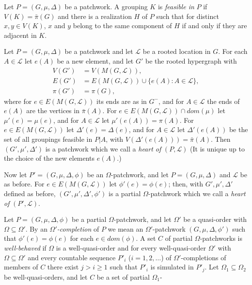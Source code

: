 Let $P = (G, \mu, \Delta)$ be a patchwork. A grouping $K$ is \textit{feasible in} $P$ if $V(K) = \bar{\pi}(G)$ and there is a realization $H$ of $P$ such that for distinct $x, y \in V(K)$, $x$ and $y$ belong to the same component of $H$ if and only if they are adjacent in $K$.

Let $P = (G, \mu, \Delta)$ be a patchwork and let $\mathcal{L}$ be a rooted location in $G$. For each $A \in \mathcal{L}$ let $e(A)$ be a new element, and let $G'$ be the rooted hypergraph with
\begin{align*}
V(G') &= V(M(G, \mathcal{L})), \\
E(G') &= E(M(G, \mathcal{L})) \cup \{e(A) : A \in \mathcal{L}\}, \\
\pi(G') &= \pi(G),
\end{align*}
where for $e \in E(M(G, \mathcal{L}))$ its ends are as in $G^-$, and for $A \in \mathcal{L}$ the ends of $e(A)$ are the vertices in $\bar{\pi}(A)$. For $e \in E(M(G, \mathcal{L})) \cap dom(\mu)$ let $\mu'(e) = \mu(e)$, and for $A \in \mathcal{L}$ let $\mu'(e(A)) = \pi(A)$. For $e \in E(M(G, \mathcal{L}))$ let $\Delta'(e) = \Delta(e)$, and for $A \in \mathcal{L}$ let $\Delta'(e(A))$ be the set of all groupings feasible in $P|A$, with $V(\Delta'(e(A))) = \bar{\pi}(A)$. Then $(G', \mu', \Delta')$ is a patchwork which we call a \textit{heart of} $(P, \mathcal{L})$ (It is unique up to the choice of the new elements $e(A)$.)

Now let $P' = (G, \mu, \Delta, \phi)$ be an $\Omega$-patchwork, and let $P = (G, \mu, \Delta)$ and $\mathcal{L}$ be as before. For $e \in E(M(G, \mathcal{L}))$ let $\phi'(e) = \phi(e)$; then, with $G', \mu', \Delta'$ defined as before, $(G', \mu', \Delta', \phi')$ is a partial $\Omega$-patchwork which we call a \textit{heart of} $(P', \mathcal{L})$.

Let $P = (G, \mu, \Delta, \phi)$ be a partial $\Omega$-patchwork, and let $\Omega'$ be a quasi-order with $\Omega \subseteq \Omega'$. By an $\Omega'$\textit{-completion} of $P$ we mean an $\Omega'$-patchwork $(G, \mu, \Delta, \phi')$ such that $\phi'(e) = \phi(e)$ for each $e \in dom(\phi)$. A set $C$ of partial $\Omega$-patchworks is \textit{well-behaved} if $\Omega$ is a well-quasi-order and for every well-quasi-order $\Omega'$ with $\Omega \subseteq \Omega'$ and every countable sequence $P'_i$ ($i = 1, 2, \dots$) of $\Omega'$-completions of members of $C$ there exist $j > i \ge 1$ such that $P'_i$ is simulated in $P'_j$. Let $\Omega_1 \subseteq \Omega_2$ be well-quasi-orders, and let $C$ be a set of partial $\Omega_1$-
